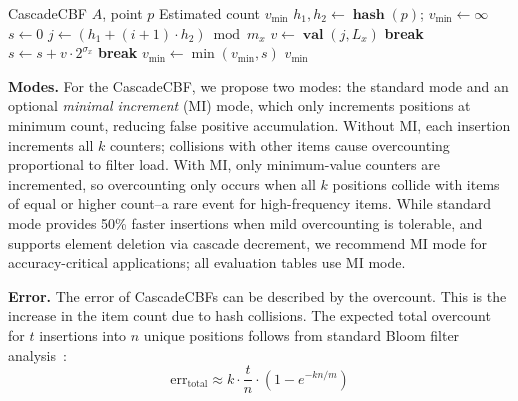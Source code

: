 \documentclass[agile, final]{copernicus-agile}
\DeclareMathOperator{\val}{\textbf{val}}
\DeclareMathOperator{\hashfn}{\textbf{hash}}
\begin{document}
\begin{algorithm}[ht]
\caption{GET Operation}
\label{alg:get}
\begin{algorithmic}[1]
\REQUIRE CascadeCBF $A$, point $p$
\ENSURE Estimated count $v_{\min}$
\STATE $h_1, h_2 \gets \hashfn(p)$; $v_{\min} \gets \infty$
  \STATE $s \gets 0$
    \STATE $j \gets (h_1 + (i+1) \cdot h_2) \bmod m_x$
    \STATE $v \gets \val(j, L_x)$
      \STATE \textbf{break} 
    \ENDIF
    \STATE $s \gets s + v \cdot 2^{\sigma_x}$ 
      \STATE \textbf{break} 
    \ENDIF
  \ENDFOR
  \STATE $v_{\min} \gets \min(v_{\min}, s)$
\ENDFOR
\RETURN $v_{\min}$
\end{algorithmic}
\end{algorithm}

\textbf{Modes.} For the CascadeCBF, we propose two modes: the standard mode and an optional \emph{minimal increment} (MI) mode, which only increments positions at minimum count, reducing false positive accumulation. Without MI, each insertion increments all $k$ counters; collisions with other items cause overcounting proportional to filter load. With MI, only minimum-value counters are incremented, so overcounting only occurs when all $k$ positions collide with items of equal or higher count--a rare event for high-frequency items.
While standard mode provides 50\% faster insertions when mild overcounting is tolerable, and supports element deletion via cascade decrement, we recommend MI mode for accuracy-critical applications; all evaluation tables use MI mode.

\textbf{Error.} The error of CascadeCBFs can be described by the overcount. This is the increase in the item count due to hash collisions. The expected total overcount for $t$ insertions into $n$ unique positions follows from standard Bloom filter analysis~\citep{broder2004network}:
\begin{equation}
\text{err}_{\text{total}} \approx k \cdot \frac{t}{n} \cdot \left(1 - e^{-kn/m}\right)
\end{equation}

\end{document}
